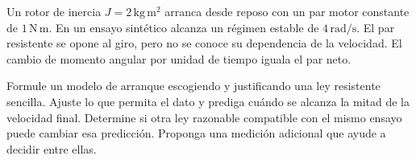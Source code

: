 Un rotor de inercia \(J=2\,\mathrm{kg\,m^2}\) arranca desde reposo con un par motor constante de \(1\,\mathrm{N\,m}\). En un ensayo sintético alcanza un régimen estable de \(4\,\mathrm{rad/s}\). El par resistente se opone al giro, pero no se conoce su dependencia de la velocidad. El cambio de momento angular por unidad de tiempo iguala el par neto.

Formule un modelo de arranque escogiendo y justificando una ley resistente sencilla. Ajuste lo que permita el dato y prediga cuándo se alcanza la mitad de la velocidad final. Determine si otra ley razonable compatible con el mismo ensayo puede cambiar esa predicción. Proponga una medición adicional que ayude a decidir entre ellas.
